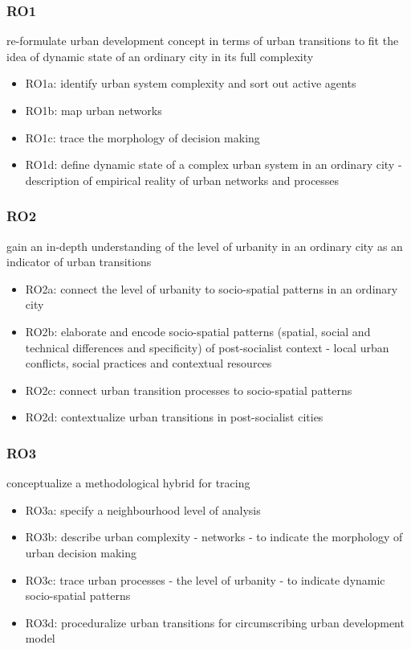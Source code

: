 \documentclass[11pt]{report}
\begin{document}
\subsubsection{RO1}
re-formulate urban development concept in terms of urban transitions to fit the idea of dynamic state of an ordinary city in its full complexity
\begin{itemize}
\item RO1a: identify urban system complexity and sort out active  agents   
\item RO1b: map  urban networks
\item RO1c: trace the morphology of decision making 
\item RO1d: define dynamic state of a complex urban system in an ordinary city - description of empirical reality of urban networks and processes
\end{itemize}

\subsubsection{RO2}
gain an in-depth understanding of the level of urbanity in an ordinary city as an indicator of urban transitions
\begin{itemize}
\item RO2a: connect the level of urbanity to socio-spatial patterns in an ordinary city
\item RO2b: elaborate and encode socio-spatial patterns (spatial, social and technical differences and specificity) of post-socialist context - local urban conflicts, social practices and contextual resources
\item RO2c: connect urban transition processes to socio-spatial patterns
\item RO2d: contextualize urban transitions in post-socialist cities 
\end{itemize}

\subsubsection{RO3}
conceptualize a methodological hybrid for tracing 
\begin{itemize}
\item RO3a: specify a neighbourhood level of analysis 
\item RO3b: describe urban complexity - networks - to indicate the morphology of urban decision making
\item RO3c: trace urban processes - the level of urbanity - to indicate dynamic socio-spatial patterns
\item RO3d: proceduralize urban transitions for circumscribing urban development model
\end{itemize}
\end{document}
